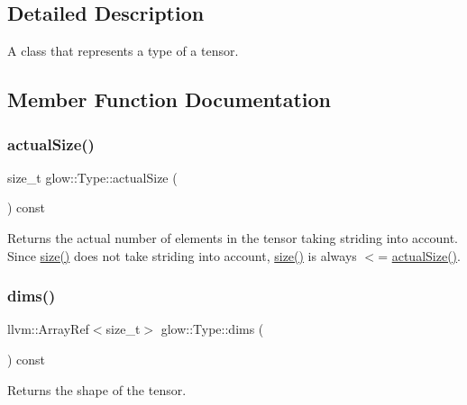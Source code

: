 \subsection{Detailed Description}
A class that represents a type of a tensor. 

\subsection{Member Function Documentation}
\mbox{\label{structglow_1_1_type_a7c624c2c77ac264040f362aeac219eae}} 
\subsubsection{\texorpdfstring{actual\+Size()}{actualSize()}}
{\footnotesize\ttfamily size\+\_\+t glow\+::\+Type\+::actual\+Size (\begin{DoxyParamCaption}{ }\end{DoxyParamCaption}) const\hspace{0.3cm}{\ttfamily [inline]}}

\begin{DoxyReturn}{Returns}
the actual number of elements in the tensor taking striding into account. Since \hyperlink{structglow_1_1_type_a8850574b9dff16a354465946ecabb861}{size()} does not take striding into account, \hyperlink{structglow_1_1_type_a8850574b9dff16a354465946ecabb861}{size()} is always $<$= \hyperlink{structglow_1_1_type_a7c624c2c77ac264040f362aeac219eae}{actual\+Size()}. 
\end{DoxyReturn}
\mbox{\label{structglow_1_1_type_abf3890a5fdcd39b5c221a513a15c5461}} 
\subsubsection{\texorpdfstring{dims()}{dims()}}
{\footnotesize\ttfamily llvm\+::\+Array\+Ref$<$size\+\_\+t$>$ glow\+::\+Type\+::dims (\begin{DoxyParamCaption}{ }\end{DoxyParamCaption}) const\hspace{0.3cm}{\ttfamily [inline]}}

\begin{DoxyReturn}{Returns}
the shape of the tensor. 
\end{DoxyReturn}
\mbox{\label{structglow_1_1_type_a85ce8b925c137209398a5891b583285b}} 

